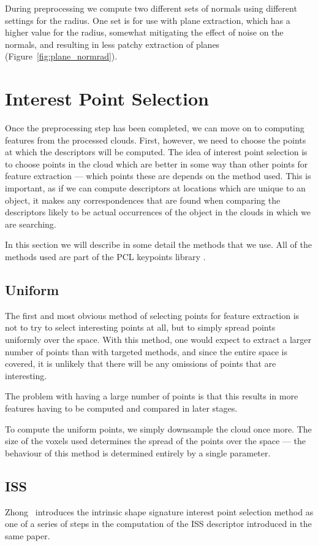 \documentclass[11pt,a4paper]{kth-mag}
\begin{document}
During preprocessing we compute two different sets of normals using different
settings for the radius. One set is for use with plane extraction, which has a
higher value for the radius, somewhat mitigating the effect of noise on the
normals, and resulting in less patchy extraction of planes
(Figure~\ref{fig:plane_normrad}).
\chapter{Interest Point Selection}
\label{chap:interest}
Once the preprocessing step has been completed, we can move on to computing
features from the processed clouds. First, however, we need to choose the points
at which the descriptors will be computed. The idea of interest point selection
is to choose points in the cloud which are better in some way than other points
for feature extraction --- which points these are depends on the method used.
This is important, as if we can compute descriptors at locations which are
unique to an object, it makes any correspondences that are found when comparing
the descriptors likely to be actual occurrences of the object in the clouds in
which we are searching.

In this section we will describe in some detail the methods that we use. All of
the methods used are part of the PCL keypoints library \cite{pcl_keypoints}.

\section{Uniform}
The first and most obvious method of selecting points for feature extraction is
not to try to select interesting points at all, but to simply spread points
uniformly over the space. With this method, one would expect to extract a larger
number of points than with targeted methods, and since the entire space is
covered, it is unlikely that there will be any omissions of points that are
interesting.

The problem with having a large number of points is that this results in more
features having to be computed and compared in later stages.

To compute the uniform points, we simply downsample the cloud once more. The
size of the voxels used determines the spread of the points over the space ---
the behaviour of this method is determined entirely by a single parameter.
\section{ISS}
Zhong~\cite{zhong2009intrinsic} introduces the intrinsic shape signature
interest point selection method as one of a series of steps in the computation
of the ISS descriptor introduced in the same paper.
\end{document}
